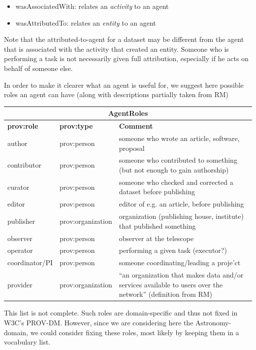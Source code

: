 \begin{itemize}
\item wasAssociatedWith: relates an \emph{activity} to an agent
\item wasAttributedTo: relates an \emph{entity} to an agent
\end{itemize}

Note that the attributed-to-agent for a dataset may be different from the agent that is associated with the activity that created an entity. Someone who is performing a task is not necessarily given full attribution, especially if he acts on behalf of someone else.

In order to make it clearer what an agent is useful for, we suggest here possible roles an agent can have (along with descriptions partially taken from RM)\\
\begin{center}
\begin{tabular}{l|l|p{}}
\multicolumn{3}{c}{\textbf{AgentRoles}}\\ \hline
\textbf{prov:role} & \textbf{prov:type} & \textbf{Comment} \\ \hline
author & prov:person & someone who wrote an article, software, proposal\\
contributor & prov:person & someone who contributed to something (but not enough to gain authorship)\\
curator & prov:person & someone who checked and corrected a dataset before publishing\\
editor & prov:person & editor of e.g. an article, before publishing\\
publisher & prov:organization & organization (publishing house, institute) that published something\\
observer & prov:person & observer at the telescope\\
operator & prov:person & performing a given task (executor?)\\
coordinator/PI & prov:person & someone coordinating/leading a proje'ct\\
provider & prov:organization & ``an organization that makes data and/or services available to users over the network'' (definition from RM)
\end{tabular}
\label{tab:agentroles}
\end{center}
This list is not complete. Such roles are domain-specific and thus not fixed in W3C's PROV-DM. However, since we are considering here the Astronomy-domain, we could 
consider fixing these roles, most likely by keeping them in a vocabulary list.

